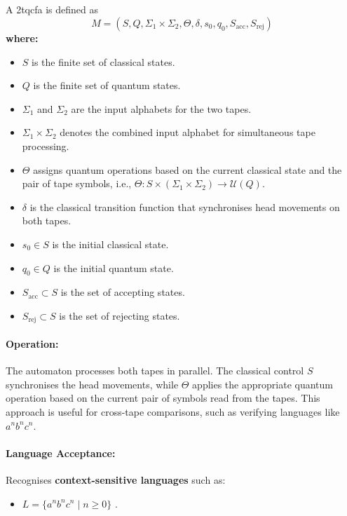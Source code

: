 \subsection{}
\label{subsec:2tqcfa}
\begin{definition}
A \gls{2tqcfa} is defined as 
\[
M = (S, Q, \Sigma_1 \times \Sigma_2, \Theta, \delta, s_0, q_0, S_{\text{acc}}, S_{\text{rej}})
\]
\textbf{where:}
\begin{itemize}
    \item \( S \) is the finite set of classical states.
    \item \( Q \) is the finite set of quantum states.
    \item \( \Sigma_1 \) and \( \Sigma_2 \) are the input alphabets for the two tapes.
    \item \( \Sigma_1 \times \Sigma_2 \) denotes the combined input alphabet for simultaneous tape processing.
    \item \( \Theta \) assigns quantum operations based on the current classical state and the pair of tape symbols, i.e., \(\Theta: S \times (\Sigma_1 \times \Sigma_2) \to \mathcal{U}(Q)\).
    \item \( \delta \) is the classical transition function that synchronises head movements on both tapes.
    \item \( s_0 \in S \) is the initial classical state.
    \item \( q_0 \in Q \) is the initial quantum state.
    \item \( S_{\text{acc}} \subset S \) is the set of accepting states.
    \item \( S_{\text{rej}} \subset S \) is the set of rejecting states.
\end{itemize}
\end{definition}

\paragraph{Operation:}  
The automaton processes both tapes in parallel. The classical control \( S \) synchronises the head movements, while \( \Theta \) applies the appropriate quantum operation based on the current pair of symbols read from the tapes. This approach is useful for cross-tape comparisons, such as verifying languages like \( a^n b^n c^n \).

\paragraph{Language Acceptance:}  
Recognises \textbf{context-sensitive languages} such as:
\begin{itemize}
    \item \( L = \{a^n b^n c^n \mid n \geq 0\} \) \cite{zheng2012two, gruska2005}.
\end{itemize}

